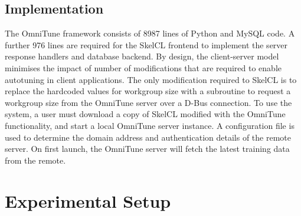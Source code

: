 \documentclass[nonatbib,preprint,9pt]{sigplanconf}
\begin{document}
\subsection{Implementation}

The OmniTune framework consists of 8987 lines of Python and MySQL
code. A further 976 lines are required for the SkelCL frontend to
implement the server response handlers and database backend. By
design, the client-server model minimises the impact of number of
modifications that are required to enable autotuning in client
applications. The only modification required to SkelCL is to replace
the hardcoded values for workgroup size with a subroutine to request a
workgroup size from the OmniTune server over a D-Bus connection. To
use the system, a user must download a copy of SkelCL modified with
the OmniTune functionality, and start a local OmniTune server
instance. A configuration file is used to determine the domain address
and authentication details of the remote server. On first launch, the
OmniTune server will fetch the latest training data from the remote.


\section{Experimental Setup}
\end{document}
